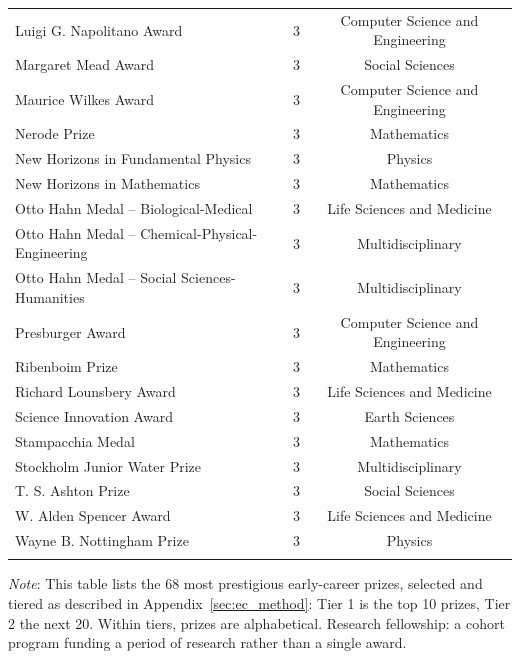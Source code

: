 \begin{longtable}{lcc}
Luigi G. Napolitano Award & 3 & Computer Science and Engineering \\ 
Margaret Mead Award & 3 & Social Sciences \\ 
Maurice Wilkes Award & 3 & Computer Science and Engineering \\ 
Nerode Prize & 3 & Mathematics \\ 
New Horizons in Fundamental Physics & 3 & Physics \\ 
New Horizons in Mathematics & 3 & Mathematics \\ 
Otto Hahn Medal -- Biological-Medical & 3 & Life Sciences and Medicine \\ 
Otto Hahn Medal -- Chemical-Physical-Engineering & 3 & Multidisciplinary \\ 
Otto Hahn Medal -- Social Sciences-Humanities & 3 & Multidisciplinary \\ 
Presburger Award & 3 & Computer Science and Engineering \\ 
Ribenboim Prize & 3 & Mathematics \\ 
Richard Lounsbery Award & 3 & Life Sciences and Medicine \\ 
Science Innovation Award & 3 & Earth Sciences \\ 
Stampacchia Medal & 3 & Mathematics \\ 
Stockholm Junior Water Prize & 3 & Multidisciplinary \\ 
T. S. Ashton Prize & 3 & Social Sciences \\ 
W. Alden Spencer Award & 3 & Life Sciences and Medicine \\ 
Wayne B. Nottingham Prize & 3 & Physics \\ 
\hline \\[-1.8ex] 
\end{longtable}\endgroup 

\noindent \footnotesize \textit{Note}: This table lists the 68 most prestigious early-career prizes, selected and tiered as described in Appendix~\ref{sec:ec_method}: Tier 1 is the top 10 prizes, Tier 2 the next 20. Within tiers, prizes are alphabetical. \textasteriskcentered{} Research fellowship: a cohort program funding a period of research rather than a single award.
